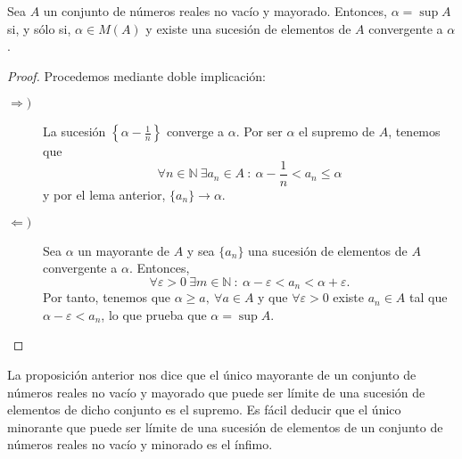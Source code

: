 \begin{prop}
    Sea $A$ un conjunto de números reales no vacío y mayorado.
    Entonces, $\alpha = \sup A$ si, y sólo si, $\alpha \in M(A)$ y existe una sucesión de elementos de $A$ convergente a $\alpha$.
\end{prop}
\begin{proof} Procedemos mediante doble implicación:
\begin{description}
    \item[$\Longrightarrow)$]
        La sucesión $\left\{\alpha - \frac{1}{n}\right\}$ converge a $\alpha$. Por ser $\alpha$ el supremo de $A$,
        tenemos que
        \begin{equation*}
            \forall n \in \mathbb{N} ~ \exists a_n \in A ~:~ \alpha - \frac{1}{n} < a_n \leq \alpha
        \end{equation*}
        y por el lema anterior, $\{a_n\} \longrightarrow \alpha$.
    
    \item[$\Longleftarrow)$]
        Sea $\alpha$ un mayorante de $A$ y sea $\{a_n\}$ una sucesión de elementos de $A$
        convergente a $\alpha$. Entonces,
        \begin{equation*}
            \forall \varepsilon > 0 ~ \exists m \in \mathbb{N} ~:~ \alpha - \varepsilon < a_n < \alpha + \varepsilon.
        \end{equation*}
        Por tanto, tenemos que $\alpha \geq a, ~ \forall a \in A$ y que $\forall \varepsilon > 0$ existe $a_n \in A$ tal
        que $\alpha - \varepsilon < a_n$, lo que prueba que $\alpha = \sup A$.
\end{description}
    
\end{proof}

La proposición anterior nos dice que el único mayorante de un conjunto de números reales no vacío y mayorado que puede ser límite de una sucesión de elementos de dicho conjunto es el supremo. Es fácil deducir que el único minorante que puede ser límite de una sucesión de elementos de un conjunto de números reales no vacío y minorado es el ínfimo.


